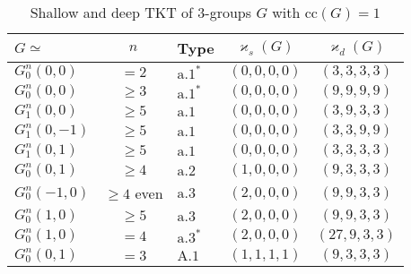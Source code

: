 \documentclass{amsart}
\theoremstyle{definition}
\numberwithin{equation}{section}
\begin{document}

\renewcommand{\arraystretch}{1.2}

\begin{table}[ht]
\caption{Shallow and deep TKT of \(3\)-groups \(G\) with \(\mathrm{cc}(G)=1\)}
\label{tbl:Main}
\begin{center}
\begin{tabular}{|l|c|l|c|c|}
\hline
 \(G\simeq\)     & \(n\)          & Type                  & \(\varkappa_s(G)\) & \(\varkappa_d(G)\) \\
\hline
 \(G_0^n(0,0)\)  & \(=2\)         & \(\mathrm{a}.1^\ast\) & \((0,0,0,0)\)      & \((3,3,3,3)\)      \\
 \(G_0^n(0,0)\)  & \(\ge 3\)      & \(\mathrm{a}.1^\ast\) & \((0,0,0,0)\)      & \((9,9,9,9)\)      \\
\hline
 \(G_1^n(0,0)\)  & \(\ge 5\)      & \(\mathrm{a}.1\)      & \((0,0,0,0)\)      & \((3,9,3,3)\)      \\
 \(G_1^n(0,-1)\) & \(\ge 5\)      & \(\mathrm{a}.1\)      & \((0,0,0,0)\)      & \((3,3,9,9)\)      \\
 \(G_1^n(0,1)\)  & \(\ge 5\)      & \(\mathrm{a}.1\)      & \((0,0,0,0)\)      & \((3,3,3,3)\)      \\
\hline
 \(G_0^n(0,1)\)  & \(\ge 4\)      & \(\mathrm{a}.2\)      & \((1,0,0,0)\)      & \((9,3,3,3)\)      \\
\hline
 \(G_0^n(-1,0)\) & \(\ge 4\) even & \(\mathrm{a}.3\)      & \((2,0,0,0)\)      & \((9,9,3,3)\)      \\
 \(G_0^n(1,0)\)  & \(\ge 5\)      & \(\mathrm{a}.3\)      & \((2,0,0,0)\)      & \((9,9,3,3)\)      \\
\hline
 \(G_0^n(1,0)\)  & \(=4\)         & \(\mathrm{a}.3^\ast\) & \((2,0,0,0)\)      & \((27,9,3,3)\)     \\
\hline
 \(G_0^n(0,1)\)  & \(=3\)         & \(\mathrm{A}.1\)      & \((1,1,1,1)\)      & \((9,3,3,3)\)      \\
\hline
\end{tabular}
\end{center}
\end{table}

\end{document}
